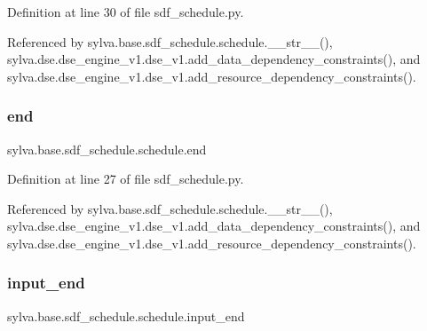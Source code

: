 Definition at line 30 of file sdf\+\_\+schedule.\+py.



Referenced by sylva.\+base.\+sdf\+\_\+schedule.\+schedule.\+\_\+\+\_\+str\+\_\+\+\_\+(), sylva.\+dse.\+dse\+\_\+engine\+\_\+v1.\+dse\+\_\+v1.\+add\+\_\+data\+\_\+dependency\+\_\+constraints(), and sylva.\+dse.\+dse\+\_\+engine\+\_\+v1.\+dse\+\_\+v1.\+add\+\_\+resource\+\_\+dependency\+\_\+constraints().

\mbox{\label{classsylva_1_1base_1_1sdf__schedule_1_1schedule_ab06ad02f1a616a347725c882c604cf07}} 
\subsubsection{\texorpdfstring{end}{end}}
{\footnotesize\ttfamily sylva.\+base.\+sdf\+\_\+schedule.\+schedule.\+end}



Definition at line 27 of file sdf\+\_\+schedule.\+py.



Referenced by sylva.\+base.\+sdf\+\_\+schedule.\+schedule.\+\_\+\+\_\+str\+\_\+\+\_\+(), sylva.\+dse.\+dse\+\_\+engine\+\_\+v1.\+dse\+\_\+v1.\+add\+\_\+data\+\_\+dependency\+\_\+constraints(), and sylva.\+dse.\+dse\+\_\+engine\+\_\+v1.\+dse\+\_\+v1.\+add\+\_\+resource\+\_\+dependency\+\_\+constraints().

\mbox{\label{classsylva_1_1base_1_1sdf__schedule_1_1schedule_aac507c8e28cb068750e8af38e58fed80}} 
\subsubsection{\texorpdfstring{input\+\_\+end}{input\_end}}
{\footnotesize\ttfamily sylva.\+base.\+sdf\+\_\+schedule.\+schedule.\+input\+\_\+end}



